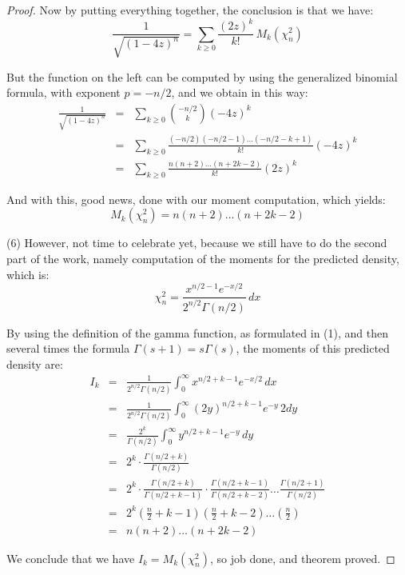 \documentclass[10pt,a4paper]{amsart}
\begin{document}
\begin{proof}
Now by putting everything together, the conclusion is that we have:
$$\frac{1}{\sqrt{(1-4z)^n}}
=\sum_{k\geq0}\frac{(2z)^k}{k!}\,M_k(\chi_n^2)$$

But the function on the left can be computed by using the generalized binomial formula, with exponent $p=-n/2$, and we obtain in this way:
\begin{eqnarray*}
\frac{1}{\sqrt{(1-4z)^n}}
&=&\sum_{k\geq0}\binom{-n/2}{k}(-4z)^k\\
&=&\sum_{k\geq0}\frac{(-n/2)(-n/2-1)\ldots(-n/2-k+1)}{k!}(-4z)^k\\
&=&\sum_{k\geq0}\frac{n(n+2)\ldots(n+2k-2)}{k!}(2z)^k
\end{eqnarray*}

And with this, good news, done with our moment computation, which yields:
$$M_k(\chi_n^2)=n(n+2)\ldots(n+2k-2)$$

(6) However, not time to celebrate yet, because we still have to do the second part of the work, namely computation of the moments for the predicted density, which is:
$$\chi_n^2=\frac{x^{n/2-1}e^{-x/2}}{2^{n/2}\Gamma(n/2)}\,dx$$

By using the definition of the gamma function, as formulated in (1), and then several times the formula $\Gamma(s+1)=s\Gamma(s)$, the moments of this predicted density are:
\begin{eqnarray*}
I_k
&=&\frac{1}{2^{n/2}\Gamma(n/2)}\int_0^\infty x^{n/2+k-1}e^{-x/2}\,dx\\
&=&\frac{1}{2^{n/2}\Gamma(n/2)}\int_0^\infty (2y)^{n/2+k-1}e^{-y}\,2dy\\
&=&\frac{2^k}{\Gamma(n/2)}\int_0^\infty y^{n/2+k-1}e^{-y}\,dy\\
&=&2^k\cdot\frac{\Gamma(n/2+k)}{\Gamma(n/2)}\\
&=&2^k\cdot\frac{\Gamma(n/2+k)}{\Gamma(n/2+k-1)}\cdot\frac{\Gamma(n/2+k-1)}{\Gamma(n/2+k-2)}\ldots\frac{\Gamma(n/2+1)}{\Gamma(n/2)}\\
&=&2^k\left(\frac{n}{2}+k-1\right)\left(\frac{n}{2}+k-2\right)\ldots\left(\frac{n}{2}\right)\\
&=&n(n+2)\ldots(n+2k-2)
\end{eqnarray*}

We conclude that we have $I_k=M_k(\chi_n^2)$, so job done, and theorem proved.
\end{proof}
\end{document}
